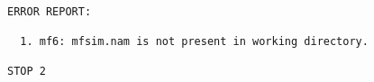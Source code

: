 {\small
\begin{lstlisting}[style=modeloutput]

ERROR REPORT:

  1. mf6: mfsim.nam is not present in working directory.

STOP 2
\end{lstlisting}
}
